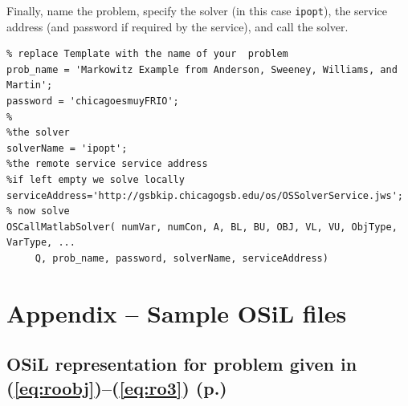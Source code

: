 \documentclass[11pt]{article}
\renewcommand{\_}{{\char"5F}}
\renewcommand{\{}{{\char"7B}}
\renewcommand{\}}{{\char"7D}}
\renewcommand{\^}{{\char"0D}}
\renewcommand{\'}{{\char"0D}}
\begin{document}
\begin{enumerate}[Step 1:]
Finally, name the problem, specify the solver (in this case {\tt ipopt}), the service address (and password if required by the service), and call the solver.



\begin{verbatim}
% replace Template with the name of your  problem
prob_name = 'Markowitz Example from Anderson, Sweeney, Williams, and Martin';
password = 'chicagoesmuyFRIO';
%
%the solver
solverName = 'ipopt';
%the remote service service address
%if left empty we solve locally
serviceAddress='http://gsbkip.chicagogsb.edu/os/OSSolverService.jws';
% now solve
OSCallMatlabSolver( numVar, numCon, A, BL, BU, OBJ, VL, VU, ObjType, VarType, ...
     Q, prob_name, password, solverName, serviceAddress)
\end{verbatim}


\section{Appendix -- Sample OSiL files}\label{section:appendix}

\subsection{OSiL representation for problem given in (\ref{eq:roobj})--(\ref{eq:ro3}) (p.\pageref{eq:roobj})}\label{section:rosenbrockXML}



\end{enumerate}
\end{document}

